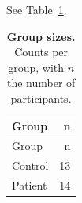 See Table~\ref{tblGroups}.

\begin{longtable}[]{@{}lr@{}}
\caption{\textbf{Group sizes.} Counts per group, with \(n\) the number of participants.}\label{tblGroups}\tabularnewline
\toprule\noalign{}
Group & n \\
\midrule\noalign{}
\endfirsthead
\toprule\noalign{}
Group & n \\
\midrule\noalign{}
\endhead
\bottomrule\noalign{}
\endlastfoot
Control & 13 \\
Patient & 14 \\
\end{longtable}

